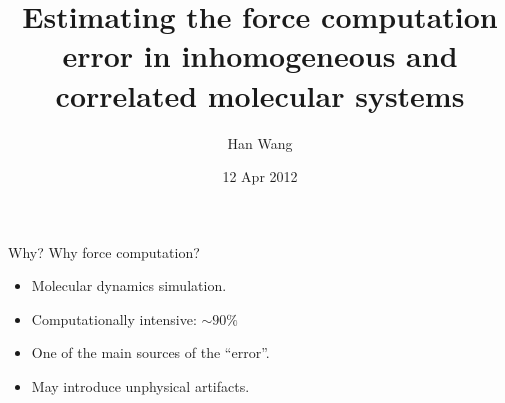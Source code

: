 \documentclass{beamer}
\newcommand{\redc}[1]{{\color{red} #1}}
\begin{document}
\title[]{
  Estimating the force computation error in inhomogeneous and correlated
  molecular systems
}
%
\author{Han Wang}
\date[12 Apr 2012]{12 Apr 2012}
\frame{\titlepage}


\begin{frame}{Why?}
  Why force computation?
  \begin{itemize}\itemsep 3pt
  \item <2->Molecular dynamics simulation.
  \item <3->Computationally intensive: \redc{$ \sim 90 \%$}
  \item <4->One of the main sources of the \redc{``error''}.
  \item <5->May introduce \redc{unphysical artifacts}.
  \end{itemize}
  \vfill
\end{frame}
\end{document}
